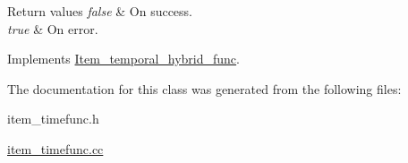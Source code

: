\begin{DoxyRetVals}{Return values}
{\em false} & On success. \\
\hline
{\em true} & On error. \\
\hline
\end{DoxyRetVals}


Implements \mbox{\hyperlink{classItem__temporal__hybrid__func_a6c18c127a5bf91544f68f303aa96dad4}{Item\+\_\+temporal\+\_\+hybrid\+\_\+func}}.



The documentation for this class was generated from the following files\+:\begin{DoxyCompactItemize}
\item 
item\+\_\+timefunc.\+h\item 
\mbox{\hyperlink{item__timefunc_8cc}{item\+\_\+timefunc.\+cc}}\end{DoxyCompactItemize}
